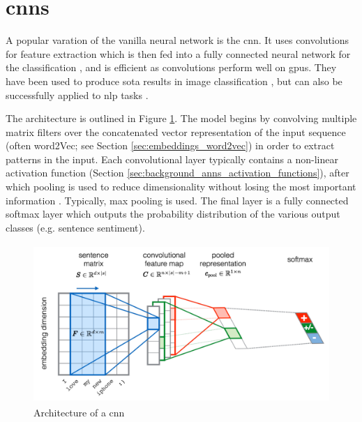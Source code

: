 \section{\acrlong{cnn}s}
\label{sec:background_cnns}

A popular varation of the vanilla neural network is the \acrfull{cnn}. It uses convolutions for feature extraction which is then fed into a fully connected neural network for the classification \citep{Budiharto}, and is efficient as convolutions perform well on \acrshort{gpu}s. They have been used to produce \acrfull{sota} results in image classification \citep{krizhevsky2017imagenet}, but can also be successfully applied to \acrshort{nlp} tasks \citep{kim2014convolutional}.

The architecture is outlined in Figure \ref{fig:cnn_architecture}. The model begins by convolving multiple matrix filters over the concatenated vector representation of the input sequence (often word2Vec; see Section \ref{sec:embeddings_word2vec}) in order to extract
patterns in the input. Each convolutional layer typically contains a non-linear activation function (Section \ref{sec:background_anns_activation_functions}), after which pooling is used to reduce dimensionality without losing the most important information \citep{Severyn2015UNITNTD}. Typically, max pooling is used. The final layer is a fully connected softmax layer which outputs the probability distribution of the various output classes (e.g. sentence sentiment).

\begin{figure}[h]
    \centering
    \includegraphics[height=6cm,trim={0 0 0cm 0cm},clip]{Paper/images/cnn.png}
    \caption{Architecture of a \acrlong{cnn} \citep{Severyn2015UNITNTD}}
    \label{fig:cnn_architecture}
\end{figure}


